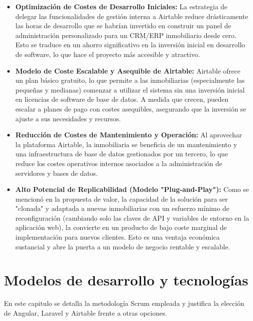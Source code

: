 \begin{itemize}
    \item \textbf{Optimización de Costes de Desarrollo Iniciales:} La estrategia de delegar las funcionalidades de gestión interna a Airtable reduce drásticamente las horas de desarrollo que se habrían invertido en construir un panel de administración personalizado para un CRM/ERP inmobiliario desde cero. Esto se traduce en un ahorro significativo en la inversión inicial en desarrollo de software, lo que hace el proyecto más accesible y atractivo.
    
    \item \textbf{Modelo de Coste Escalable y Asequible de Airtable:} Airtable ofrece un plan básico gratuito, lo que permite a las inmobiliarias (especialmente las pequeñas y medianas) comenzar a utilizar el sistema sin una inversión inicial en licencias de software de base de datos. A medida que crecen, pueden escalar a planes de pago con costes asequibles, asegurando que la inversión se ajuste a sus necesidades y recursos.
    
    \item \textbf{Reducción de Costes de Mantenimiento y Operación:} Al aprovechar la plataforma Airtable, la inmobiliaria se beneficia de un mantenimiento y una infraestructura de base de datos gestionados por un tercero, lo que reduce los costes operativos internos asociados a la administración de servidores y bases de datos.
    
    \item \textbf{Alto Potencial de Replicabilidad (Modelo "Plug-and-Play"):} Como se mencionó en la propuesta de valor, la capacidad de la solución para ser "clonada" y adaptada a nuevas inmobiliarias con un esfuerzo mínimo de reconfiguración (cambiando solo las claves de API y variables de entorno en la aplicación web), la convierte en un producto de bajo coste marginal de implementación para nuevos clientes. Esto es una ventaja económica sustancial y abre la puerta a un modelo de negocio rentable y escalable.
\end{itemize}


\chapter{Modelos de desarrollo y tecnologías} 
\label{sec:modelosdesarrollotecnologias}


En este capitulo se detalla la metodología Scrum empleada y justifica la elección de Angular, Laravel y Airtable frente a otras opciones.


